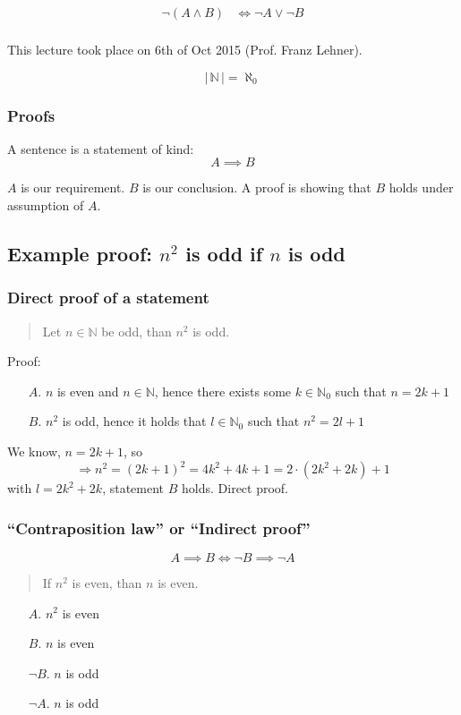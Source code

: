 \documentclass[a4paper,landscape,twocolumn]{article}
\newcommand\meta[3]{This #1 took place on #2 (#3).\par}
\newcommand\card[1]{\left|\,#1\,\right|}
\begin{document}
\begin{align*}
  \neg(A \land B) &\Leftrightarrow \neg A \lor \neg B \\
\end{align*}

\meta{lecture}{6th of Oct 2015}{Prof. Franz Lehner}

\[ \card{\mathbb{N}} = \aleph_0 \]

\subsubsection{Proofs}

A sentence is a statement of kind:
\[ A \implies B \]

$A$ is our requirement. $B$ is our conclusion.
A proof is showing that $B$ holds under assumption of $A$.

\subsection[Example proof: $n^2$ is odd if $n$ is odd]{Example proof: $n^2$ is odd if $n$ is odd}
\subsubsection{Direct proof of a statement}
%
\begin{quote}
  Let $n \in \mathbb{N}$ be odd, than $n^2$ is odd.
\end{quote}

Proof:
\begin{itemize}
  \item[$A$.] $n$ is even and $n \in \mathbb{N}$, hence there exists some
           $k \in \mathbb{N}_0$ such that $n = 2k + 1$
  \item[$B$.] $n^2$ is odd, hence it holds that $l \in \mathbb{N}_0$ such that
           $n^2 = 2l + 1$
\end{itemize}

We know, $n = 2k + 1$, so
\[ \Rightarrow n^2 = (2k + 1)^2 = 4k^2 + 4k + 1 = 2\cdot(2k^2 + 2k) + 1 \]
with $l = 2k^2 + 2k$, statement $B$ holds. Direct proof.

\subsubsection{\enquote{Contraposition law} or \enquote{Indirect proof}}
%
\[ A \implies B \Leftrightarrow \neg B \implies \neg A \]
%
\begin{quote}
  If $n^2$ is even, than $n$ is even.
\end{quote}
%
\begin{itemize}
  \item[$A$.] $n^2$ is even
  \item[$B$.] $n$ is even
  \item[$\neg B$.] $n$ is odd
  \item[$\neg A$.] $n$ is odd
\end{itemize}
\end{document}
